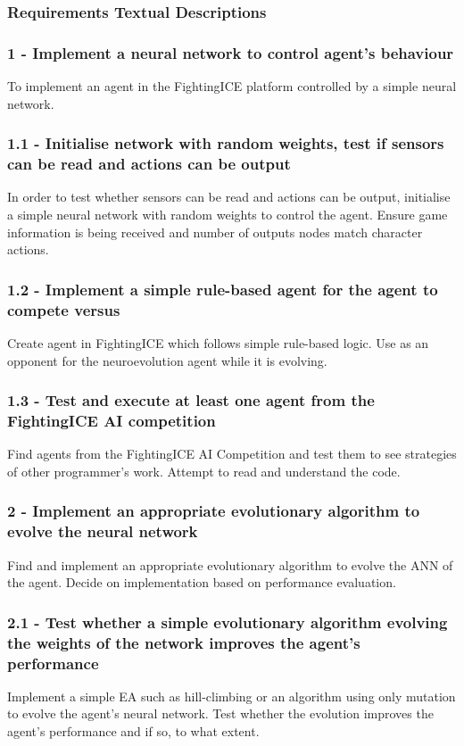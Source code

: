 \documentclass[11pt,a4paper]{article}
\begin{document}
\subsubsection{Requirements Textual Descriptions}
\subsubsection*{1 - Implement a neural network to control agent's behaviour}
To implement an agent in the FightingICE platform controlled by a simple neural network.
\subsubsection*{1.1 - Initialise network with random weights, test if sensors can be read and actions can be output}
In order to test whether sensors can be read and actions can be output, initialise a simple neural network with random weights to control the agent. Ensure game information is being received and number of outputs nodes match character actions.
\subsubsection*{1.2 - Implement a simple rule-based agent for the agent to compete versus}
Create agent in FightingICE which follows simple rule-based logic. Use as an opponent for the neuroevolution agent while it is evolving.
\subsubsection*{1.3 - Test and execute at least one agent from the FightingICE AI competition}
Find agents from the FightingICE AI Competition and test them to see strategies of other programmer's work. Attempt to read and understand the code.
\subsubsection*{2 - Implement an appropriate evolutionary algorithm to evolve the neural network}
Find and implement an appropriate evolutionary algorithm to evolve the ANN of the agent. Decide on implementation based on performance evaluation.
\subsubsection*{2.1 - Test whether a simple evolutionary algorithm evolving the weights of the network improves the agent's performance}
Implement a simple EA such as hill-climbing or an algorithm using only mutation to evolve the agent's neural network. Test whether the evolution improves the agent's performance and if so, to what extent.
\newpage
\end{document}
